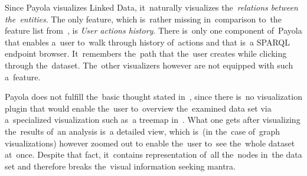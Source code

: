 Since Payola visualizes Linked Data, it~naturally visualizes the~\emph{relations between the~entities}.
The only feature, which is~rather missing in~comparison to~the feature list from~\cite{mantra}, is
\emph{User actions history}.
There is~only one component of~Payola that enables a~user to~walk through 
history of~actions and that is~a SPARQL endpoint browser. It~remembers the~path 
that the~user creates while clicking through the~dataset. The~other visualizers 
however are not equipped with such a~feature.

Payola does not fulfill the~basic thought stated in~\cite{mantra}, since 
there is~no visualization plugin that would enable the~user to~overview the~examined data set via a~specialized visualization such as~a treemap 
in~\cite{lodvis}. What one gets after visualizing the~results of~an analysis is~a 
detailed view, which is~(in the~case of~graph visualizations) however zoomed out
to enable the~user to~see the~whole dataset at~once. Despite that fact, it~contains representation of~all the~nodes in~the data set and therefore breaks 
the~visual information seeking mantra.

